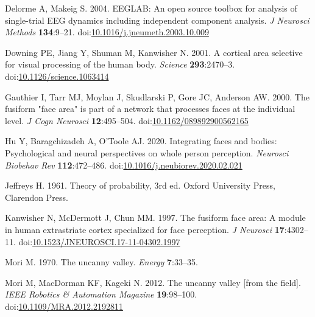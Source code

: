 \documentclass[
]{article}
\newlength{\cslhangindent}
\newlength{\cslentryspacingunit} %
\newenvironment{CSLReferences}[2] %
 {%
  \setlength{\parindent}{0pt}
  \ifodd #1
  \let\oldpar\par
  \def\par{\hangindent=\cslhangindent\oldpar}
  \fi
  \setlength{\parskip}{#2\cslentryspacingunit}
 }%
 {}
\begin{document}
\hypertarget{refs}{}
\begin{CSLReferences}{1}{0}
\leavevmode{}%
Delorme A, Makeig S. 2004. {EEGLAB}: An open source toolbox for analysis of single-trial {EEG} dynamics including independent component analysis. \emph{J Neurosci Methods} \textbf{134}:9--21. doi:\href{https://doi.org/10.1016/j.jneumeth.2003.10.009}{10.1016/j.jneumeth.2003.10.009}

\leavevmode{}%
Downing PE, Jiang Y, Shuman M, Kanwisher N. 2001. A cortical area selective for visual processing of the human body. \emph{Science} \textbf{293}:2470--3. doi:\href{https://doi.org/10.1126/science.1063414}{10.1126/science.1063414}

\leavevmode{}%
Gauthier I, Tarr MJ, Moylan J, Skudlarski P, Gore JC, Anderson AW. 2000. The fusiform "face area" is part of a network that processes faces at the individual level. \emph{J Cogn Neurosci} \textbf{12}:495--504. doi:\href{https://doi.org/10.1162/089892900562165}{10.1162/089892900562165}

\leavevmode{}%
Hu Y, Baragchizadeh A, O'Toole AJ. 2020. Integrating faces and bodies: Psychological and neural perspectives on whole person perception. \emph{Neurosci Biobehav Rev} \textbf{112}:472--486. doi:\href{https://doi.org/10.1016/j.neubiorev.2020.02.021}{10.1016/j.neubiorev.2020.02.021}

\leavevmode{}%
Jeffreys H. 1961. Theory of probability, 3rd ed. Oxford University Press, Clarendon Press.

\leavevmode{}%
Kanwisher N, McDermott J, Chun MM. 1997. The fusiform face area: A module in human extrastriate cortex specialized for face perception. \emph{J Neurosci} \textbf{17}:4302--11. doi:\href{https://doi.org/10.1523/JNEUROSCI.17-11-04302.1997}{10.1523/JNEUROSCI.17-11-04302.1997}

\leavevmode{}%
Mori M. 1970. The uncanny valley. \emph{Energy} \textbf{7}:33--35.

\leavevmode{}%
Mori M, MacDorman KF, Kageki N. 2012. The uncanny valley {[}from the field{]}. \emph{IEEE Robotics \& Automation Magazine} \textbf{19}:98--100. doi:\href{https://doi.org/10.1109/MRA.2012.2192811}{10.1109/MRA.2012.2192811}


\end{CSLReferences}
\end{document}
